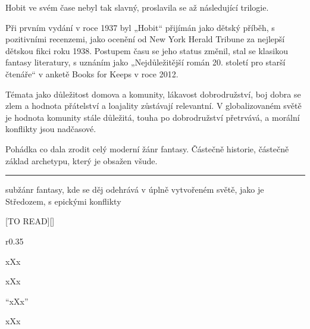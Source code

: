 \documentclass{extarticle} %
\begin{document}
\noindent Hobit ve svém čase nebyl tak slavný, proslavila se až následující trilogie.

Při prvním vydání v roce 1937 byl „Hobit“ přijímán jako dětský příběh,
s pozitivními recenzemi,
jako ocenění od New York Herald Tribune za nejlepší dětskou fikci roku 1938.
Postupem času se jeho status změnil, stal se klasikou fantasy literatury,
s uznáním jako „Nejdůležitější román 20. století pro starší čtenáře“
v anketě Books for Keeps v roce 2012.

\noindent Témata jako důležitost domova a komunity, lákavost dobrodružství,
boj dobra se zlem a hodnota přátelství a loajality zůstávají relevantní.
V globalizovaném světě je hodnota komunity stále důležitá, touha po dobrodružství přetrvává,
a morální konflikty jsou nadčasové.

\noindent 
Pohádka co dala zrodit celý moderní žánr fantasy. Částečně historie, částečně základ archetypu, který je obsažen všude.

\vfill

\noindent\begin{minipage}{\textwidth}
    {\textcolor{\wpagecolor}{\rule{\linewidth}{0.4pt}}
    \footnotesize
     subžánr fantasy, kde se děj odehrává v úplně vytvořeném světě,
    jako je Středozem, s epickými konflikty
    }
\end{minipage}

\newpage


\changefontsize{8pt}

[TO READ][\killpage]

\noindent\begin{wrapfigure}{r}{0.35\textwidth}
\tiny

\setlength{\parindent}{3pt}
xXx
\end{wrapfigure}


\noindent xXx



\noindent 
\enquote{xXx}

\noindent 
xXx
\end{document}
